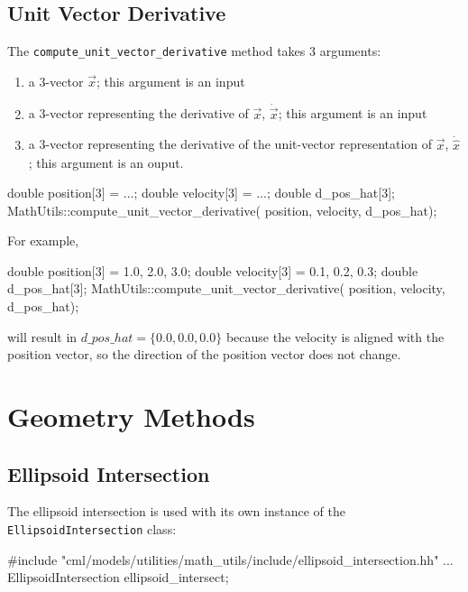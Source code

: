 \documentclass[11pt,fleqn]{report}
\begin{document}
\subsection{Unit Vector Derivative}
The \texttt{compute\_unit\_vector\_derivative} method takes 3 arguments:
\begin {enumerate}
 \item a 3-vector $\vec x$; this argument is an input
 \item a 3-vector representing the derivative of $\vec x$, $\dot{\vec x}$;
 this argument is an input
 \item a 3-vector representing the derivative of the unit-vector
 representation of $\vec x$, $\dot{ \hat x}$; this argument is an ouput.
\end {enumerate}
\begin{code}
double position[3] = ...;
double velocity[3] = ...;
double d_pos_hat[3];
MathUtils::compute_unit_vector_derivative( position,
 velocity,
 d_pos_hat);
\end{code}
For example,
\begin{code}
double position[3] = {1.0, 2.0, 3.0};
double velocity[3] = {0.1, 0.2, 0.3};
double d_pos_hat[3];
MathUtils::compute_unit_vector_derivative( position,
 velocity,
 d_pos_hat);
\end{code}
will result in $d\_pos\_hat = \{0.0, 0.0, 0.0\}$ because the velocity is
aligned with
the position vector, so the direction of the position vector does not change.


\section{Geometry Methods}
\subsection{Ellipsoid Intersection}
The ellipsoid intersection is used with its own instance of the 
\texttt{EllipsoidIntersection} class:
\begin{code}
#include "cml/models/utilities/math_utils/include/ellipsoid_intersection.hh"
...
EllipsoidIntersection ellipsoid_intersect;
\end{code}
\end{document}
